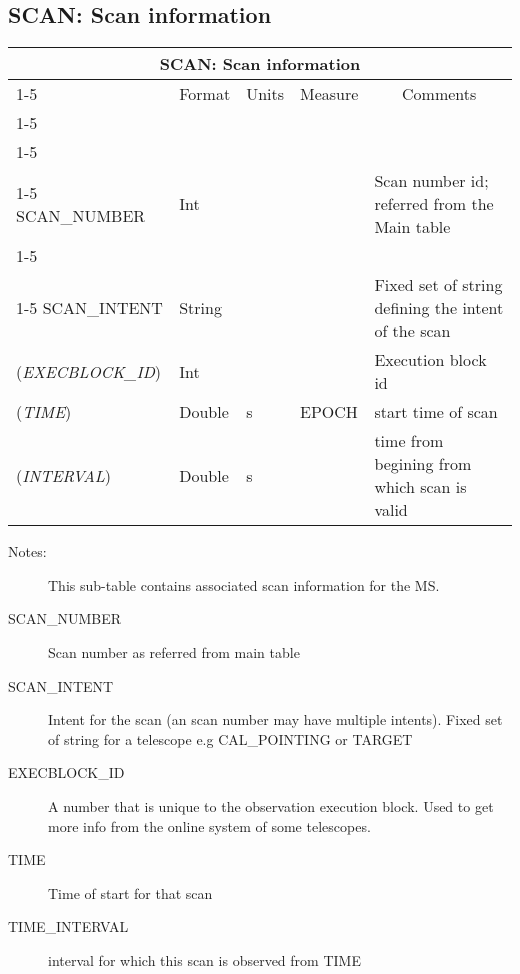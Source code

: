 \documentclass{article}
\newcommand{\defline}[1]{\cline{1-5}
\multicolumn{5}{|l|}{#1} \\
\cline{1-5}}
\newcommand{\definetable}[2]
{
	\vfill\newpage
	\subsection{#1}
        \vspace{0.15in}
        \small
	\begin{tabular}{|l|p{1.25in}|l|p{.9in}|p{1.4in}|}
	\hline
	\multicolumn{5}{|c|}{\bf #1}\\ 
	\cline{1-5}
        \multicolumn{1}{|c|}{Name}&\multicolumn{1}{|c|}{Format}&
        \multicolumn{1}{|c|}{Units}&\multicolumn{1}{|c|}{Measure}&
        \multicolumn{1}{|c|}{Comments}\\
        \cline{1-5}
        #2
        \hline
	\end{tabular}
}
\begin{document}
\definetable{SCAN: Scan information}{
\defline{\bf Columns}
\defline{\em Key}
SCAN\_NUMBER & Int &  &        & Scan number id; referred from the Main table\\

\defline{\em Data}  
SCAN\_INTENT  & String &    &      & Fixed set of string defining the intent of the scan \\
({\it EXECBLOCK\_ID}) & Int & & & Execution block id\\
({\it TIME})   & Double & s & EPOCH & start time of scan\\
({\it INTERVAL})   & Double & s &  & time from begining from which scan is valid\\

}
\begin{description}

\item[Notes:] This sub-table contains associated scan information
for the MS.
\item[SCAN\_NUMBER] Scan number as referred from main table
\item[SCAN\_INTENT] Intent for the scan (an scan number may have multiple intents). Fixed set of string for a telescope e.g CAL\_POINTING or TARGET 
\item[EXECBLOCK\_ID] A number that is unique to the observation execution block. Used to get more info from the online system of some telescopes.

\item[TIME]  Time of start for that scan

\item[TIME\_INTERVAL] interval for which this scan is observed from TIME

\end{description}
\end{document}
